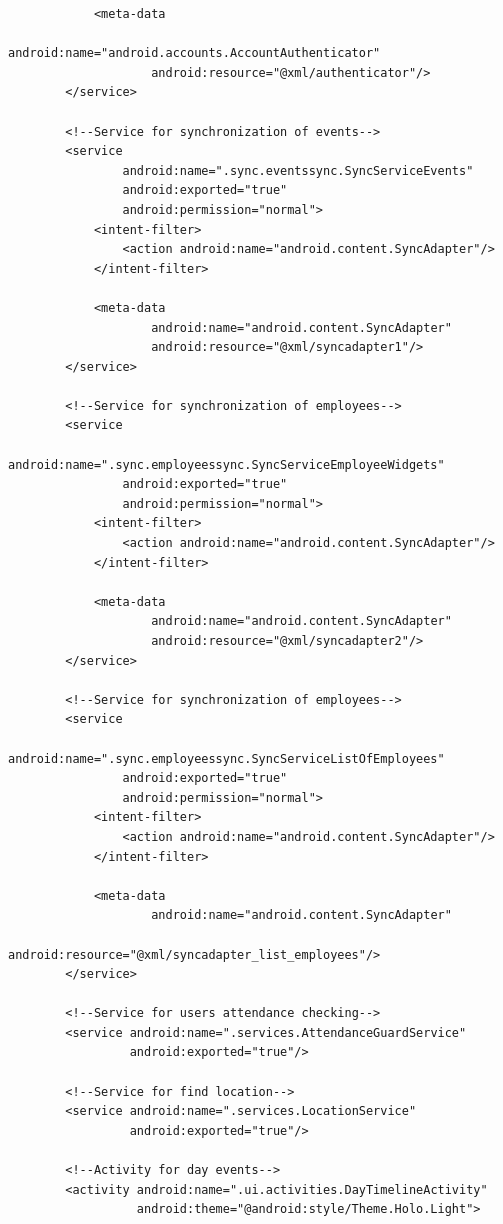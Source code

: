 \documentclass{diplomka}
\begin{document}
\begin{lstlisting}
            <meta-data
                    android:name="android.accounts.AccountAuthenticator"
                    android:resource="@xml/authenticator"/>
        </service>

        <!--Service for synchronization of events-->
        <service
                android:name=".sync.eventssync.SyncServiceEvents"
                android:exported="true"
                android:permission="normal">
            <intent-filter>
                <action android:name="android.content.SyncAdapter"/>
            </intent-filter>

            <meta-data
                    android:name="android.content.SyncAdapter"
                    android:resource="@xml/syncadapter1"/>
        </service>

        <!--Service for synchronization of employees-->
        <service
                android:name=".sync.employeessync.SyncServiceEmployeeWidgets"
                android:exported="true"
                android:permission="normal">
            <intent-filter>
                <action android:name="android.content.SyncAdapter"/>
            </intent-filter>

            <meta-data
                    android:name="android.content.SyncAdapter"
                    android:resource="@xml/syncadapter2"/>
        </service>

        <!--Service for synchronization of employees-->
        <service
                android:name=".sync.employeessync.SyncServiceListOfEmployees"
                android:exported="true"
                android:permission="normal">
            <intent-filter>
                <action android:name="android.content.SyncAdapter"/>
            </intent-filter>

            <meta-data
                    android:name="android.content.SyncAdapter"
                    android:resource="@xml/syncadapter_list_employees"/>
        </service>

        <!--Service for users attendance checking-->
        <service android:name=".services.AttendanceGuardService"
                 android:exported="true"/>

        <!--Service for find location-->
        <service android:name=".services.LocationService"
                 android:exported="true"/>

        <!--Activity for day events-->
        <activity android:name=".ui.activities.DayTimelineActivity"
                  android:theme="@android:style/Theme.Holo.Light">


\end{lstlisting}
\end{document}
